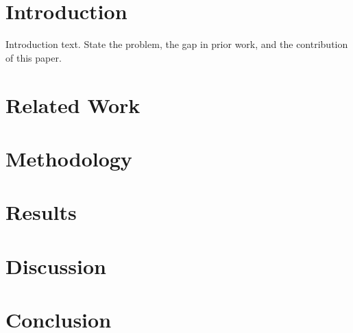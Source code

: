 \documentclass[journal,article,submit,moreauthors,pdftex]{Definitions/tsp}
\begin{document}
\section{Introduction} \label{sect:introduction}

Introduction text. State the problem, the gap in prior work, and the contribution of this paper.

\section{Related Work} \label{sect:related}

\section{Methodology} \label{sect:method}

\section{Results} \label{sect:results}

\section{Discussion} \label{sect:discussion}

\section{Conclusion} \label{sect:conclusion}



\end{document}
